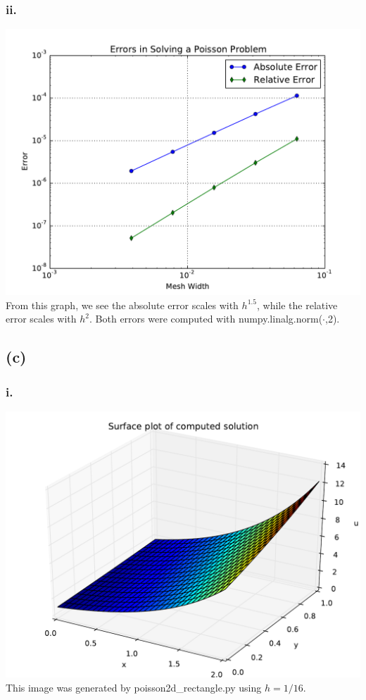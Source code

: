\documentclass{article}
\begin{document}
\subsubsection*{ii.}
\includegraphics[width=\linewidth]{bii.pdf}
From this graph, we see the absolute error scales with $h^{1.5}$, while the relative error scales with $h^2$. Both errors were computed with numpy.linalg.norm($\cdot$,2).
\subsection*{(c)}
\subsubsection*{i.}
\includegraphics[width=\linewidth]{ci.pdf}
This image was generated by poisson2d\_rectangle.py using $h=1/16$.
\end{document}
